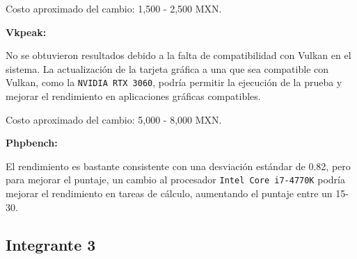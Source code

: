 \documentclass[12pt]{article}
\begin{document}
\begin{enumerate}[label=(\arabic{section}.\arabic{subsection}.\arabic{enumi})]
Costo aproximado del cambio: 1,500 - 2,500 MXN.

\textbf{Vkpeak:}

No se obtuvieron resultados debido a la falta de compatibilidad con Vulkan en el sistema. La actualización de la tarjeta gráfica a una que sea compatible con Vulkan, como la \texttt{NVIDIA RTX 3060}, podría permitir la ejecución de la prueba y mejorar el rendimiento en aplicaciones gráficas compatibles.

Costo aproximado del cambio: 5,000 - 8,000 MXN.

\textbf{Phpbench:}

El rendimiento es bastante consistente con una desviación estándar de 0.82, pero para mejorar el puntaje, un cambio al procesador \texttt{Intel Core i7-4770K} podría mejorar el rendimiento en tareas de cálculo, aumentando el puntaje entre un 15-30.
\end{enumerate}

\subsection{Integrante 3}
\end{document}
